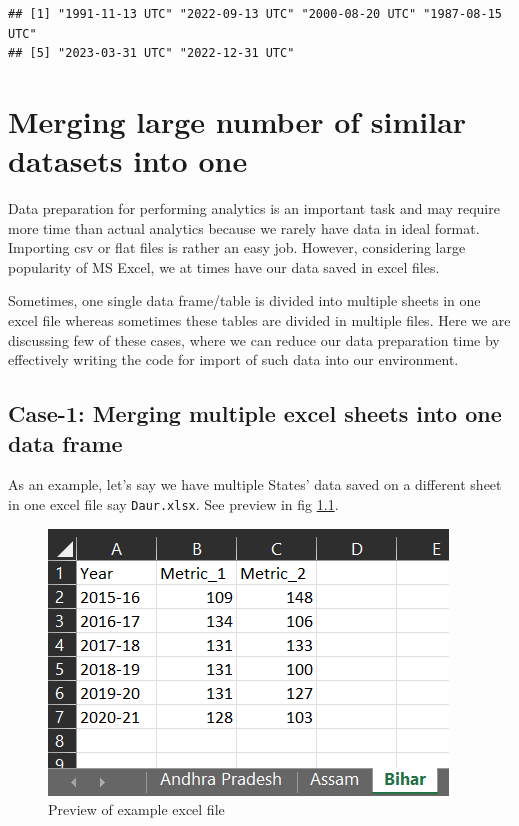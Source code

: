 \documentclass[
]{book}
\begin{document}
\begin{verbatim}
## [1] "1991-11-13 UTC" "2022-09-13 UTC" "2000-08-20 UTC" "1987-08-15 UTC"
## [5] "2023-03-31 UTC" "2022-12-31 UTC"
\end{verbatim}

\hypertarget{merging-large-number-of-similar-datasets-into-one}{%
\chapter{Merging large number of similar datasets into one}\label{merging-large-number-of-similar-datasets-into-one}}

Data preparation for performing analytics is an important task and may require more time than actual analytics because we rarely have data in ideal format. Importing csv or flat files is rather an easy job. However, considering large popularity of MS Excel, we at times have our data saved in excel files.

Sometimes, one single data frame/table is divided into multiple sheets in one excel file whereas sometimes these tables are divided in multiple files. Here we are discussing few of these cases, where we can reduce our data preparation time by effectively writing the code for import of such data into our environment.

\hypertarget{case-1-merging-multiple-excel-sheets-into-one-data-frame}{%
\section{\texorpdfstring{\textbf{Case-1}: Merging multiple excel sheets into one data frame}{Case-1: Merging multiple excel sheets into one data frame}}\label{case-1-merging-multiple-excel-sheets-into-one-data-frame}}

As an example, let's say we have multiple States' data saved on a different sheet in one excel file say \texttt{Daur.xlsx}. See preview in fig \ref{fig:prevexcel}.

\begin{figure}

{\centering \includegraphics[width=1\linewidth]{images/excel} 

}

\caption{Preview of example excel file}\label{fig:prevexcel}
\end{figure}
\end{document}

